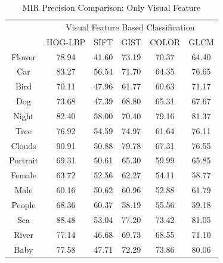 \begin{table}
\centering
\caption{ MIR Precision Comparison: Only Visual Feature} %
\vspace*{0.2 cm}
\begin{tabular}{| c | c | c | c | c | c |}
\hline
 {\multirow{2}{*}{Labels}} & \multicolumn{5}{|c|}{Visual Feature Based Classification} \\
 \cline{2-6}
 & HOG-LBP & SIFT & GIST & COLOR & GLCM \\  [1ex] \hline
Flower &  78.94 & 41.60 & 73.19 & 70.37 & 64.40 \\  [1ex] \hline
Car & 83.27 & 56.54 & 71.70 & 64.35 & 76.65 \\  [1ex] \hline
Bird &  70.11 & 47.96 & 61.77 & 60.63 & 71.17 \\  [1ex] \hline
Dog &  73.68 & 47.39 & 68.80 & 65.31 & 67.67 \\  [1ex] \hline
Night &  82.40 & 58.00 & 70.40 & 79.16 & 81.37 \\  [1ex] \hline
Tree &  76.92 & 54.59 & 74.97 & 61.64 & 76.11 \\  [1ex] \hline
Clouds &  90.91 & 50.88 & 79.78 & 67.31 & 76.55 \\  [1ex] \hline
Portrait &  69.31 & 50.61 & 65.30 & 59.99 & 65.85 \\  [1ex] \hline
Female & 63.72 & 52.56 & 62.27 & 54.11 & 58.77 \\  [1ex] \hline
Male &  60.16 & 50.62 & 60.96 & 52.88 & 61.79 \\  [1ex] \hline
People &  68.36 & 60.37 & 58.19 & 55.56 & 59.18 \\  [1ex] \hline
Sea & 88.48 & 53.04 & 77.20 & 73.42 & 81.05 \\  [1ex] \hline
River & 77.14 & 46.68 & 69.73 & 68.55 & 71.10 \\  [1ex] \hline
Baby & 77.58 & 47.71 & 72.29 & 73.86 & 80.06 \\  [1ex]  \hline
\end{tabular}
\label{MIRPrecisionVisual} %
\end{table}
